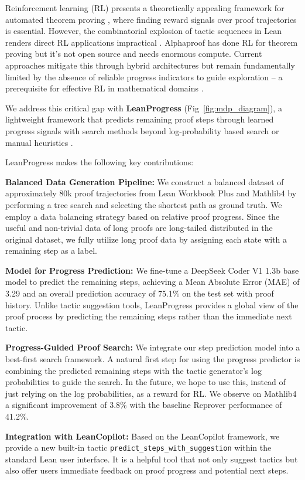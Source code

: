 Reinforcement learning (RL) presents a theoretically appealing framework for automated theorem proving \citep{dong2024formaltheoremprovingrewarding}, where finding reward signals over proof trajectories is essential. However, the combinatorial explosion of tactic sequences in Lean \citep{10.1145/3573105.3575669} renders direct RL applications impractical \citep{setlur2024rewardingprogressscalingautomated}. Alphaproof \citep{alphaproof2024ai} has done RL for theorem proving but it's not open source and needs enormous compute. Current approaches mitigate this through hybrid architectures \citep{wang2023legoproverneuraltheoremproving} but remain fundamentally limited by the absence of reliable progress indicators to guide exploration -- a prerequisite for effective RL in mathematical domains \citep{gao2024designingeffectiverlreward}.

We address this critical gap with \textbf{LeanProgress} (Fig~\ref{fig:mdp_diagram}), a lightweight framework that predicts remaining proof steps through learned progress signals with search methods beyond log-probability based search \citep{song2024largelanguagemodelscopilots} or manual heuristics \citep{ringer2021proof}.

LeanProgress makes the following key contributions:

\textbf{Balanced Data Generation Pipeline:} We construct a balanced dataset of approximately 80k proof trajectories from Lean Workbook Plus and Mathlib4 by performing a tree search and selecting the shortest path as ground truth. We employ a data balancing strategy based on relative proof progress. Since the useful and non-trivial data of long proofs are long-tailed distributed in the original dataset, we fully utilize long proof data by assigning each state with a remaining step as a label.

\textbf{Model for Progress Prediction:} We fine-tune a DeepSeek Coder V1 1.3b base model to predict the remaining steps, achieving a Mean Absolute Error (MAE) of 3.29 and an overall prediction accuracy of 75.1\% on the test set with proof history. Unlike tactic suggestion tools, LeanProgress provides a global view of the proof process by predicting the remaining steps rather than the immediate next tactic.

\textbf{Progress-Guided Proof Search:} We integrate our step prediction model into a best-first search framework. A natural first step for using the progress predictor is 
combining the predicted remaining steps with the tactic generator's log probabilities to guide the search. In the future, we hope to use this, instead of just relying on the log probabilities, as a reward for RL.  We observe on Mathlib4 a significant improvement of 3.8\% with the baseline Reprover performance
of 41.2\%.

\textbf{Integration with LeanCopilot:} Based on the LeanCopilot framework, we provide a new built-in tactic \texttt{predict\_steps\_with\_suggestion} within the standard Lean user interface. It is a helpful tool that not only suggest tactics but also offer users immediate feedback on proof progress and potential next steps.

